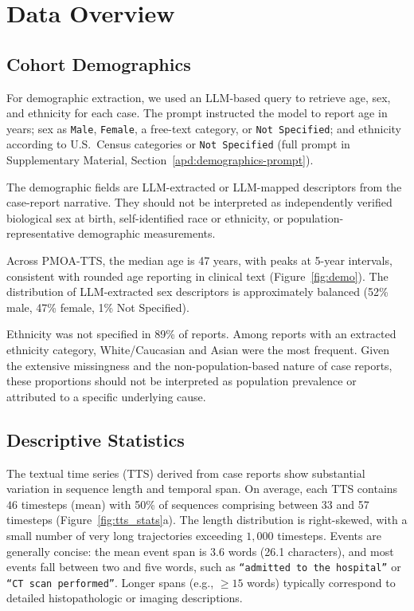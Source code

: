 \documentclass[pdflatex,sn-mathphys-num]{sn-jnl}%
\newif\ifshowrebuttalcolor
\newcommand{\rebuttal}[1]{%
  \ifshowrebuttalcolor
    \textcolor{rebuttalblue}{#1}%
  \else
    #1%
  \fi
}
\theoremstyle{thmstyleone}%
\theoremstyle{thmstyletwo}%
\theoremstyle{thmstylethree}%
\begin{document}
\section{Data Overview}
\label{sec:data-overview}

\subsection{Cohort Demographics}
\label{sec:cohort-demographics}

For demographic extraction, we used an LLM-based query to retrieve age, sex, and ethnicity for each case.
The prompt instructed the model to report age in years; sex as \texttt{Male}, \texttt{Female}, a free-text category, or \texttt{Not Specified}; and ethnicity according to U.S.\ Census categories or \texttt{Not Specified} (full prompt in Supplementary Material, Section~\ref{apd:demographics-prompt}).
\rebuttal{
The demographic fields are LLM-extracted or LLM-mapped descriptors from the case-report narrative. They should not be interpreted as independently verified biological sex at birth, self-identified race or ethnicity, or population-representative demographic measurements.
}

Across PMOA-TTS, the median age is 47 years, with peaks at 5-year intervals, consistent with rounded age reporting in clinical text (Figure~\ref{fig:demo}).
The distribution of LLM-extracted sex descriptors is approximately balanced (52\% male, 47\% female, 1\% Not Specified).
\rebuttal{
Ethnicity was not specified in 89\% of reports. Among reports with an extracted ethnicity category, White/Caucasian and Asian were the most frequent. Given the extensive missingness and the non-population-based nature of case reports, these proportions should not be interpreted as population prevalence or attributed to a specific underlying cause.
}



\subsection{Descriptive Statistics}
\label{sec:descriptive-statistics}

The textual time series (TTS) derived from case reports show substantial variation in sequence length and temporal span. 
On average, each TTS contains $46$ timesteps (mean) %
with 50\% of sequences comprising between 33 and 57 timesteps (Figure~\ref{fig:tts_stats}a). 
The length distribution is right-skewed, with a small number of very long trajectories exceeding $1{,}000$ timesteps. 
Events are generally concise: the mean event span is 3.6 words (26.1 characters), and most events fall between two and five words, such as \texttt{“admitted to the hospital”} or \texttt{“CT scan performed”}. 
Longer spans (e.g., $\geq 15$ words) typically correspond to detailed histopathologic or imaging descriptions.
\end{document}
